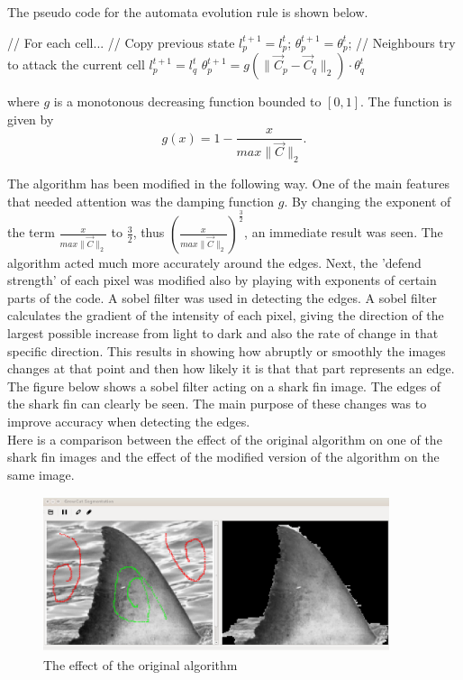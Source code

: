 \documentclass[a4paper,10pt]{article}
\begin{document}
\newpage
\noindent The pseudo code for the automata evolution rule is shown below. 
\begin{algorithm}[H]
\begin{algorithmic}[1]
 \State // For each cell...
 \State // Copy previous state
 \State $l^{t+1}_{p} = l^{t}_{p}$;
 \State $\theta_{p}^{t+1} = \theta_{p}^{t}$;
 \State // Neighbours try to attack the current cell
 \State $l^{t+1}_{p} = l^{t}_{q}$
 \State $\theta^{t+1}_{p} = g(\| \overrightarrow{C}_{p} - \overrightarrow{C}_{q}
\|_{2}) \cdot \theta^{t}_{q}$
 \EndIf
 \EndFor
 \EndFor
\end{algorithmic}
\end{algorithm}

\noindent where $g$ is a monotonous decreasing function bounded to $[0, 1]$. 
The function is given by
\[
g(x) = 1 - \frac{x}{max\| \overrightarrow{C} \|_{2}}. 
\]


\noindent The algorithm has been modified in the following way.  One of the
main features that needed attention was the damping function $g$.  By changing
the exponent of the term $\frac{x}{max\| \overrightarrow{C} \|_{2}}$ to
$\frac{3}{2}$, thus $\left ({\frac{x}{max\| \overrightarrow{C} \|_{2}}}\right
) ^\frac{3}{2}$,
an immediate result was seen.  The algorithm acted much more accurately around
the edges.  Next, the 'defend strength' of each pixel was modified also by
playing with exponents
of certain parts of the code.  A
sobel filter was used in detecting the edges.  A sobel filter calculates the
gradient of the intensity of each pixel, giving
the direction of the largest possible increase from light to dark and also the
rate of change in that specific direction.   This results in showing how
abruptly or smoothly the images changes at that point and then how likely it
is that that part represents an edge.  The figure below shows a sobel filter
acting on a shark fin image.  The edges of the shark fin can clearly be seen.
The main purpose of these changes was to improve accuracy when detecting the
edges.  \\


\noindent Here is a comparison between the effect of the original algorithm on
one of the shark fin images and the effect of the modified version of the
algorithm on the same image.
\begin{figure}[H]
 \centering
 \includegraphics[width=4in, height=1.8in]{haaio}
 \caption{The effect of the original algorithm}
 \label{fin1}
\end{figure}
\end{document}
